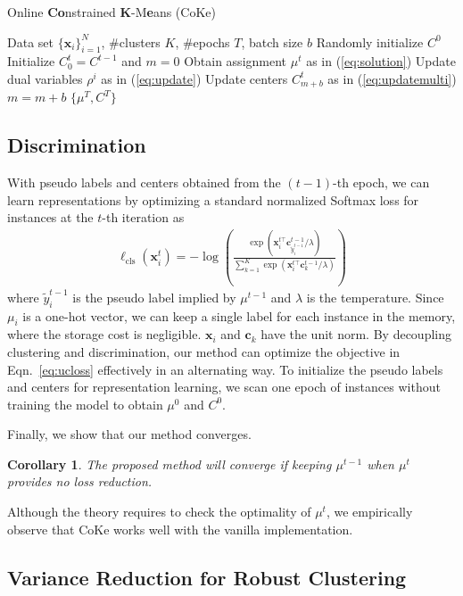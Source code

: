 \documentclass[10pt,twocolumn,letterpaper]{article}
\def \x {\mathbf{x}}
\def \cc {\mathbf{c}}
\newtheorem{cor}{Corollary}
\begin{document}
\begin{algorithm}[t]
   \caption{Online \textbf{Co}nstrained \textbf{K}-M\textbf{e}ans (CoKe)}
   \label{alg:ck}
\begin{algorithmic}
    Data set $\{\x_i\}_{i=1}^N$, \#clusters $K$, \#epochs $T$, batch size $b$
   \STATE Randomly initialize $C^0$
   \STATE Initialize $C_{0}^t = C^{t-1}$ and $m=0$
   \STATE Obtain assignment $\mu^t$ as in (\ref{eq:solution})
   \STATE Update dual variables $\rho^{i}$ as in (\ref{eq:update})
   \STATE Update centers $C_{m+b}^t$ as in (\ref{eq:updatemulti})
   \STATE $m=m+b$
   \ENDFOR
   \ENDFOR
   \RETURN $\{\mu^T, C^T\}$
\end{algorithmic}
\end{algorithm}


\subsection{Discrimination}
With pseudo labels and centers obtained from the $(t-1)$-th epoch, we can learn representations by optimizing a standard normalized Softmax loss for instances at the $t$-th iteration as
\begin{eqnarray}\label{eq:loss}
\ell_{\mathrm{cls}}(\x_i^t) = -\log(\frac{\exp(\x_i^{t\top} \cc_{\tilde{y}_i^{t-1}}^{t-1}/\lambda)}{\sum_{k=1}^K \exp(\x_i^{t\top} \cc_{k}^{t-1}/\lambda)})
\end{eqnarray}
where $\tilde{y}_i^{t-1}$ is the pseudo label implied by $\mu^{t-1}$ and $\lambda$ is the temperature. Since $\mu_{i}$ is a one-hot vector, we can keep a single label for each instance in the memory, where the storage cost is negligible. $\x_i$ and $\cc_k$ have the unit norm. By decoupling clustering and discrimination, our method can optimize the objective in Eqn.~\ref{eq:ucloss} effectively in an alternating way. To initialize the pseudo labels and centers for representation learning, we scan one epoch of instances without training the model to obtain $\mu^0$ and $C^0$.

Finally, we show that our method converges. 
\begin{cor}
The proposed method will converge if keeping $\mu^{t-1}$ when $\mu^t$ provides no loss reduction.
\end{cor}
Although the theory requires to check the optimality of $\mu^t$, we empirically observe that CoKe works well with the vanilla implementation.

\subsection{Variance Reduction for Robust Clustering}
\end{document}
